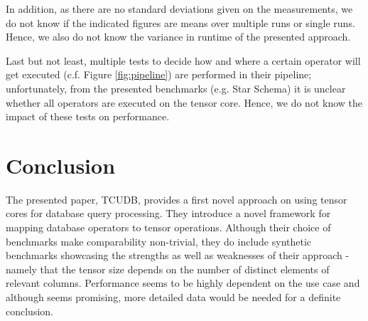\documentclass{paper}
\begin{document}
	In addition, as there are no standard deviations given on the measurements, we do not know if the indicated figures are means over multiple runs or single runs. Hence, we also do not know the variance in runtime of the presented approach. 
	
	Last but not least, multiple tests to decide how and where a certain operator will get executed (c.f. Figure \ref{fig:pipeline}) are performed in their pipeline; unfortunately, from the presented benchmarks (e.g. Star Schema) it is unclear whether all operators are executed on the tensor core. Hence, we do not know the impact of these tests on performance.
	
	
	\section{Conclusion}
	
	The presented paper, TCUDB, provides a first novel approach on using tensor cores for database query processing. They introduce a novel framework for mapping database operators to tensor operations. Although their choice of benchmarks make comparability non-trivial, they do include synthetic benchmarks showcasing the strengths as well as weaknesses of their approach - namely that the tensor size depends on the number of distinct elements of relevant columns. Performance seems to be highly dependent on the use case and although seems promising, more detailed data would be needed for a definite conclusion.
	
	
	
	
	
\end{document}
